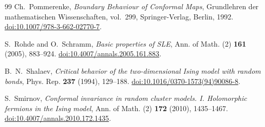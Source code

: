 \begin{thebibliography}{99}
Ch.~Pommerenke,
\emph{Boundary Behaviour of Conformal Maps},
Grundlehren der mathematischen Wissenschaften, vol.~299,
Springer-Verlag, Berlin, 1992.
\href{https://doi.org/10.1007/978-3-662-02770-7}{doi:10.1007/978-3-662-02770-7}.

S.~Rohde and O.~Schramm,
\emph{Basic properties of SLE},
Ann. of Math. (2) \textbf{161} (2005), 883--924.
\href{https://doi.org/10.4007/annals.2005.161.883}{doi:10.4007/annals.2005.161.883}.

B.~N.~Shalaev,
\emph{Critical behavior of the two-dimensional Ising model with random bonds},
Phys. Rep. \textbf{237} (1994), 129--188.
\href{https://doi.org/10.1016/0370-1573(94)90086-8}{doi:10.1016/0370-1573(94)90086-8}.

S.~Smirnov,
\emph{Conformal invariance in random cluster models. I. Holomorphic fermions in the Ising model},
Ann. of Math. (2) \textbf{172} (2010), 1435--1467.
\href{https://doi.org/10.4007/annals.2010.172.1435}{doi:10.4007/annals.2010.172.1435}.

\end{thebibliography}
